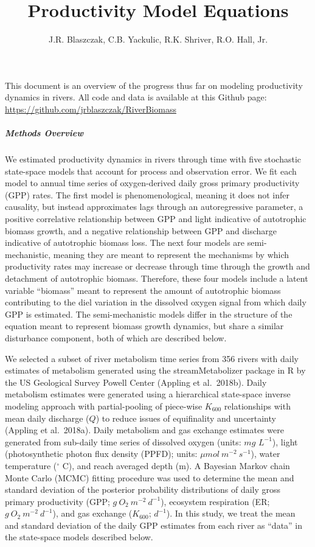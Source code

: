 \documentclass[
]{article}
\title{Productivity Model Equations}
\author{J.R. Blaszczak, C.B. Yackulic, R.K. Shriver, R.O. Hall, Jr.}
\date{}
\begin{document}
\maketitle

This document is an overview of the progress thus far on modeling
productivity dynamics in rivers. All code and data is available at this
Github page: \url{https://github.com/jrblaszczak/RiverBiomass}

\hypertarget{methods-overview}{%
\subparagraph{Methods Overview}\label{methods-overview}}

We estimated productivity dynamics in rivers through time with five
stochastic state-space models that account for process and observation
error. We fit each model to annual time series of oxygen-derived daily
gross primary productivity (GPP) rates. The first model is
phenomenological, meaning it does not infer causality, but instead
approximates lags through an autoregressive parameter, a positive
correlative relationship between GPP and light indicative of autotrophic
biomass growth, and a negative relationship between GPP and discharge
indicative of autotrophic biomass loss. The next four models are
semi-mechanistic, meaning they are meant to represent the mechanisms by
which productivity rates may increase or decrease through time through
the growth and detachment of autotrophic biomass. Therefore, these four
models include a latent variable ``biomass'' meant to represent the
amount of autotrophic biomass contributing to the diel variation in the
dissolved oxygen signal from which daily GPP is estimated. The
semi-mechanistic models differ in the structure of the equation meant to
represent biomass growth dynamics, but share a similar disturbance
component, both of which are described below.

We selected a subset of river metabolism time series from 356 rivers
with daily estimates of metabolism generated using the streamMetabolizer
package in R by the US Geological Survey Powell Center (Appling et
al.~2018b). Daily metabolism estimates were generated using a
hierarchical state-space inverse modeling approach with partial-pooling
of piece-wise \(K_{600}\) relationships with mean daily discharge
(\(Q\)) to reduce issues of equifinality and uncertainty (Appling et
al.~2018a). Daily metabolism and gas exchange estimates were generated
from sub-daily time series of dissolved oxygen (units: \(mg\)
\(L^{-1}\)), light (photosynthetic photon flux density (PPFD); units:
\(\mu mol\ m^{-2}\ s^{-1}\)), water temperature (\(^\circ\) C), and
reach averaged depth (m). A Bayesian Markov chain Monte Carlo (MCMC)
fitting procedure was used to determine the mean and standard deviation
of the posterior probability distributions of daily gross primary
productivity (GPP; \(g\ O_{2}\ m^{-2}\ d^{-1}\)), ecosystem respiration
(ER; \(g\ O_{2}\ m^{-2}\ d^{-1}\)), and gas exchange (\(K_{600}\);
\(d^{-1}\)). In this study, we treat the mean and standard deviation of
the daily GPP estimates from each river as ``data'' in the state-space
models described below.
\end{document}
